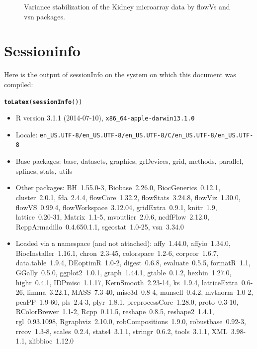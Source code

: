 \documentclass{article}\usepackage[]{graphicx}\usepackage[]{color}
\makeatletter
\newcommand{\hlstd}[1]{\textcolor[rgb]{0.345,0.345,0.345}{#1}}%
\newcommand{\hlkwd}[1]{\textcolor[rgb]{0.737,0.353,0.396}{\textbf{#1}}}%
\newenvironment{kframe}{%
 \def\at@end@of@kframe{}%
 \ifinner\ifhmode%
  \def\at@end@of@kframe{\end{minipage}}%
  \begin{minipage}{\columnwidth}%
 \fi\fi%
 \def\FrameCommand##1{\hskip\@totalleftmargin \hskip-\fboxsep
 \colorbox{shadecolor}{##1}\hskip-\fboxsep
     \hskip-\linewidth \hskip-\@totalleftmargin \hskip\columnwidth}%
 \MakeFramed {\advance\hsize-\width
   \@totalleftmargin\z@ \linewidth\hsize
   \@setminipage}}%
 {\par\unskip\endMakeFramed%
 \at@end@of@kframe}
\newenvironment{knitrout}{}{} %
\makeatother
\begin{document}
\begin{knitrout}
\begin{figure}
{}

\caption[Variance stabilization of the Kidney microarray data by flowVs and vsn packages]{Variance stabilization of the Kidney microarray data by flowVs and vsn packages.}\label{fig:vsn}
\end{figure}


\end{knitrout}

\newpage
\section{Sessioninfo}
Here is the output of sessionInfo on the system on which this document was compiled:

\begin{kframe}
\begin{alltt}
\hlkwd{toLatex}\hlstd{(}\hlkwd{sessionInfo}\hlstd{())}
\end{alltt}
\end{kframe}\begin{itemize}\raggedright
  \item R version 3.1.1 (2014-07-10), \verb|x86_64-apple-darwin13.1.0|
  \item Locale: \verb|en_US.UTF-8/en_US.UTF-8/en_US.UTF-8/C/en_US.UTF-8/en_US.UTF-8|
  \item Base packages: base, datasets, graphics, grDevices, grid,
    methods, parallel, splines, stats, utils
  \item Other packages: BH~1.55.0-3, Biobase~2.26.0,
    BiocGenerics~0.12.1, cluster~2.0.1, fda~2.4.4,
    flowCore~1.32.2, flowStats~3.24.8, flowViz~1.30.0,
    flowVS~0.99.4, flowWorkspace~3.12.04, gridExtra~0.9.1,
    knitr~1.9, lattice~0.20-31, Matrix~1.1-5, mvoutlier~2.0.6,
    ncdfFlow~2.12.0, RcppArmadillo~0.4.650.1.1, sgeostat~1.0-25,
    vsn~3.34.0
  \item Loaded via a namespace (and not attached): affy~1.44.0,
    affyio~1.34.0, BiocInstaller~1.16.1, chron~2.3-45,
    colorspace~1.2-6, corpcor~1.6.7, data.table~1.9.4,
    DEoptimR~1.0-2, digest~0.6.8, evaluate~0.5.5, formatR~1.1,
    GGally~0.5.0, ggplot2~1.0.1, graph~1.44.1, gtable~0.1.2,
    hexbin~1.27.0, highr~0.4.1, IDPmisc~1.1.17,
    KernSmooth~2.23-14, ks~1.9.4, latticeExtra~0.6-26,
    limma~3.22.1, MASS~7.3-40, misc3d~0.8-4, munsell~0.4.2,
    mvtnorm~1.0-2, pcaPP~1.9-60, pls~2.4-3, plyr~1.8.1,
    preprocessCore~1.28.0, proto~0.3-10, RColorBrewer~1.1-2,
    Rcpp~0.11.5, reshape~0.8.5, reshape2~1.4.1, rgl~0.93.1098,
    Rgraphviz~2.10.0, robCompositions~1.9.0, robustbase~0.92-3,
    rrcov~1.3-8, scales~0.2.4, stats4~3.1.1, stringr~0.6.2,
    tools~3.1.1, XML~3.98-1.1, zlibbioc~1.12.0
\end{itemize}




\end{document}
